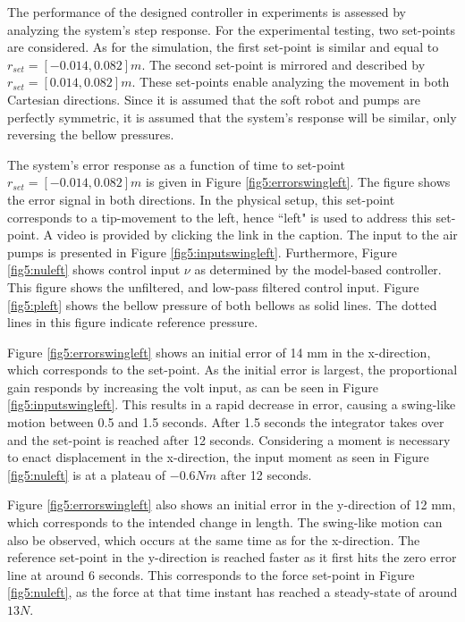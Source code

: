 The performance of the designed controller in experiments is assessed by analyzing the system's step response. For the experimental testing, two set-points are considered. As for the simulation, the first set-point is similar and equal to $r_{set} = [-0.014,0.082] m$. The second set-point is mirrored and described by $r_{set} = [0.014,0.082] m$. These set-points enable analyzing the movement in both Cartesian directions. Since it is assumed that the soft robot and pumps are perfectly symmetric, it is assumed that the system's response will be similar, only reversing the bellow pressures.

The system's error response as a function of time to set-point $r_{set} = [-0.014,0.082] m$ is given in Figure \ref{fig5:errorswingleft}. The figure shows the error signal in both directions. In the physical setup, this set-point corresponds to a tip-movement to the left, hence ``left"  is used to address this set-point. A video is provided by clicking the link in the caption. The input to the air pumps is presented in Figure \ref{fig5:inputswingleft}. Furthermore, Figure \ref{fig5:nuleft} shows control input $\nu$ as determined by the model-based controller. This figure shows the unfiltered, and low-pass filtered control input. Figure \ref{fig5:pleft} shows the bellow pressure of both bellows as solid lines. The dotted lines in this figure indicate reference pressure.


Figure \ref{fig5:errorswingleft} shows an initial error of 14 mm in the x-direction, which corresponds to the set-point. As the initial error is largest, the proportional gain responds by increasing the volt input, as can be seen in Figure \ref{fig5:inputswingleft}. This results in a rapid decrease in error, causing a swing-like motion between 0.5 and 1.5 seconds. After 1.5 seconds the integrator takes over and the set-point is reached after 12 seconds. Considering a moment is necessary to enact displacement in the x-direction, the input moment as seen in Figure \ref{fig5:nuleft} is at a plateau of $-0.6 Nm$ after 12 seconds. 

Figure \ref{fig5:errorswingleft} also shows an initial error in the y-direction of 12 mm, which corresponds to the intended change in length. The swing-like motion can also be observed, which occurs at the same time as for the x-direction. The reference set-point in the y-direction is reached faster as it first hits the zero error line at around 6 seconds. This corresponds to the force set-point in Figure \ref{fig5:nuleft}, as the force at that time instant has reached a steady-state of around $13N$. 

